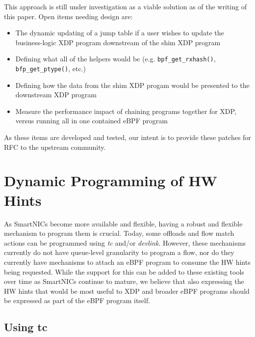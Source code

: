 \documentclass[letterpaper]{article}
\begin{document}
\indent This approach is still under investigation as a viable solution as of the writing of this paper. Open items needing design are:
\begin{itemize}
\item The dynamic updating of a jump table if a user wishes to update the business-logic XDP program downstream of the shim XDP program
\item Defining what all of the helpers would be (e.g. {\small \texttt{bpf\_get\_rxhash()}}, {\small \texttt{bfp\_get\_ptype()}}, etc.)
\item Defining how the data from the shim XDP progam would be presented to the downstream XDP program
\item Measure the performance impact of chaining programs together for XDP, versus running all in one contained eBPF program
\end{itemize}
As these items are developed and tested, our intent is to provide these patches for RFC to the upstream community.

\section{Dynamic Programming of HW Hints}

As SmartNICs become more available and flexible, having a robust and flexible mechanism to program them is crucial. Today, some offloads and flow match actions can be programmed using \textit{tc} and/or \textit{devlink}. However, these mechanisms currently do not have queue-level granularity to program a flow, nor do they currently have mechanisms to attach an eBPF program to consume the HW hints being requested. While the support for this can be added to these existing tools over time as SmartNICs continue to mature, we believe that also expressing the HW hints that would be most useful to XDP and broader eBPF programs should be expressed as part of the eBPF program itself.

\subsection{Using tc}
\end{document}
